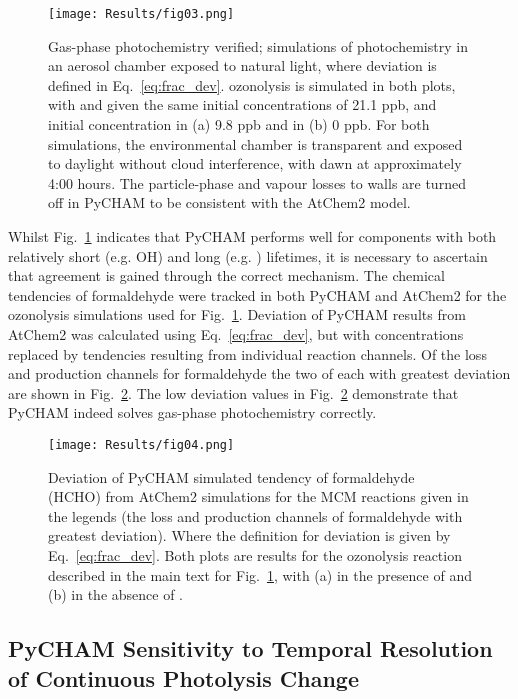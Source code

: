 \documentclass[gmd, manuscript]{copernicus}
\begin{document}
\begin{figure}[t]
\texttt{[image: Results/fig03.png]}
\caption{Gas-phase photochemistry verified; simulations of photochemistry in an aerosol chamber exposed to natural light, where deviation is defined in Eq.~\ref{eq:frac_dev}.   ozonolysis is simulated in both plots, with  and  given the same initial concentrations of 21.1 \unit{ppb}, and initial  concentration in (a) 9.8 \unit{ppb} and in (b) 0 \unit{ppb}.  For both simulations, the environmental chamber is transparent and exposed to daylight without cloud interference, with dawn at approximately 4:00 hours.  The particle-phase and vapour losses to walls are turned off in PyCHAM to be consistent with the AtChem2 model.}
\label{fig:GasChemVer1}
\end{figure}

Whilst Fig.~\ref{fig:GasChemVer1} indicates that PyCHAM performs well for components with both relatively short (e.g. OH) and long (e.g. ) lifetimes, it is necessary to ascertain that agreement is gained through the correct mechanism.  The chemical tendencies of formaldehyde were tracked in both PyCHAM and AtChem2 for the  ozonolysis simulations used for Fig.~\ref{fig:GasChemVer1}.  Deviation of PyCHAM results from AtChem2 was calculated using Eq.~\ref{eq:frac_dev}, but with concentrations replaced by tendencies resulting from individual reaction channels.  Of the loss and production channels for formaldehyde the two of each with greatest deviation are shown in Fig.~\ref{fig:GasChemVer2}.  The low deviation values in Fig.~\ref{fig:GasChemVer2} demonstrate that PyCHAM indeed solves gas-phase photochemistry correctly.

\begin{figure}[t]
\texttt{[image: Results/fig04.png]}
\caption{Deviation of PyCHAM simulated tendency of formaldehyde (HCHO) from AtChem2 simulations for the MCM reactions given in the legends (the loss and production channels of formaldehyde with greatest deviation).  Where the definition for deviation is given by Eq.~\ref{eq:frac_dev}.  Both plots are results for the  ozonolysis reaction described in the main text for Fig.~\ref{fig:GasChemVer1}, with (a) in the presence of  and (b) in the absence of .}
\label{fig:GasChemVer2}
\end{figure}


\subsection{PyCHAM Sensitivity to Temporal Resolution of Continuous Photolysis Change}
\end{document}
